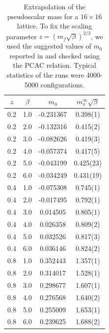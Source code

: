 \begin{table}
    \centering
    \begin{tabular}{c|c|c|c}
        $z$ & $\beta$ & $m_0$ & $m_{\pi}^{\infty}\sqrt{\beta}$  \\
        \hline \hline
        0.2 & 1.0 & -0.231367 & 0.398(1) \\
        0.2 & 2.0 & -0.132316 & 0.415(2) \\
        0.2 & 3.0 & -0.082626 & 0.419(3) \\
        0.2 & 4.0 & -0.057374 & 0.417(5) \\
        0.2 & 5.0 & -0.043199 & 0.425(23) \\
        0.2 & 6.0 & -0.034249 & 0.431(19) \\
        0.4 & 1.0 & -0.075308 & 0.745(1) \\
        0.4 & 2.0 & -0.017495 & 0.792(1) \\
        0.4 & 3.0 & 0.014505 & 0.805(1) \\
        0.4 & 4.0 & 0.026358 & 0.809(2) \\
        0.4 & 5.0 & 0.032526 & 0.817(3) \\
        0.4 & 6.0 & 0.036146 & 0.824(2) \\
        0.8 & 1.0 & 0.352443 & 1.357(1) \\
        0.8 & 2.0 & 0.314017 & 1.528(1) \\
        0.8 & 3.0 & 0.298677 & 1.607(1) \\
        0.8 & 4.0 & 0.276568 & 1.640(2) \\
        0.8 & 5.0 & 0.255009 & 1.653(1) \\
        0.8 & 6.0 & 0.239625 & 1.688(2) \\
    \end{tabular}
    \caption{Extrapolation of the pseudoscalar mass for a $16 \times 16$ lattice. To fix the scaling parameter $z = (m_f \sqrt{\beta})^{2/3}$, we used the suggested values of $m_0$ reported in \cite{Christian_2006} and checked using the PCAC relation. Typical statistics of the runs were 4000-5000 configurations.}
    \label{tab: pion 16}
\end{table}
